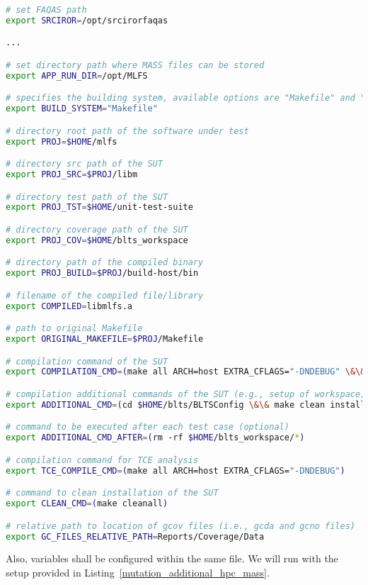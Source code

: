 \begin{lstlisting}[language=bash, label=mutation_additional_hpc ,caption=\MASS variables. Excerpt of mass\_conf.sh file.]
# set FAQAS path
export SRCIROR=/opt/srcirorfaqas

...

# set directory path where MASS files can be stored
export APP_RUN_DIR=/opt/MLFS

# specifies the building system, available options are "Makefile" and "waf"
export BUILD_SYSTEM="Makefile"

# directory root path of the software under test
export PROJ=$HOME/mlfs

# directory src path of the SUT
export PROJ_SRC=$PROJ/libm

# directory test path of the SUT
export PROJ_TST=$HOME/unit-test-suite

# directory coverage path of the SUT
export PROJ_COV=$HOME/blts_workspace

# directory path of the compiled binary
export PROJ_BUILD=$PROJ/build-host/bin

# filename of the compiled file/library
export COMPILED=libmlfs.a

# path to original Makefile
export ORIGINAL_MAKEFILE=$PROJ/Makefile

# compilation command of the SUT
export COMPILATION_CMD=(make all ARCH=host EXTRA_CFLAGS="-DNDEBUG" \&\& make all COVERAGE="true" ARCH=host_cov EXTRA_CFLAGS="-DNDEBUG")

# compilation additional commands of the SUT (e.g., setup of workspace)
export ADDITIONAL_CMD=(cd $HOME/blts/BLTSConfig \&\& make clean install INSTALL_PATH="$HOME/blts_install" \&\& cd $HOME/blts_workspace \&\& $HOME/blts_install/bin/blts_app --init)

# command to be executed after each test case (optional)
export ADDITIONAL_CMD_AFTER=(rm -rf $HOME/blts_workspace/*)

# compilation command for TCE analysis
export TCE_COMPILE_CMD=(make all ARCH=host EXTRA_CFLAGS="-DNDEBUG")

# command to clean installation of the SUT
export CLEAN_CMD=(make cleanall)

# relative path to location of gcov files (i.e., gcda and gcno files)
export GC_FILES_RELATIVE_PATH=Reports/Coverage/Data
\end{lstlisting}

Also, \MASS variables shall be configured within the same file. We will run \MASS with the setup provided in Listing~\ref{mutation_additional_hpc_mass}.

